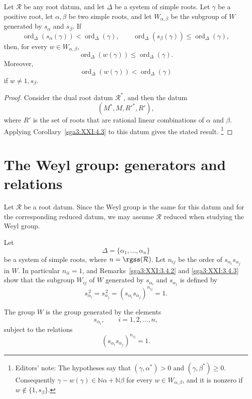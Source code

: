 \begin{corollary}\label{sga3:XXI:4.4}
Let \(\mathcal{R}\) be any root datum, and let \(\Delta\) be a system
of simple roots. Let \(\gamma\) be a positive root, let
\(\alpha,\beta\) be two simple roots, and let \(W_{\alpha,\beta}\) be
the subgroup of \(W\) generated by \(s_\alpha\) and \(s_\beta\). If
\[
 \operatorname{ord}_\Delta(s_\alpha(\gamma))
 <\operatorname{ord}_\Delta(\gamma),
 \qquad
 \operatorname{ord}_\Delta(s_\beta(\gamma))
 \le\operatorname{ord}_\Delta(\gamma),
\]
then, for every \(w\in W_{\alpha,\beta}\),
\[
 \operatorname{ord}_\Delta(w(\gamma))
 \le\operatorname{ord}_\Delta(\gamma).
\]
Moreover,
\[
 \operatorname{ord}_\Delta(w(\gamma))
 <\operatorname{ord}_\Delta(\gamma)
\]
if \(w\ne1,s_\beta\).
\end{corollary}

\begin{proof}
Consider the dual root datum \(\mathcal{R}^\ast\), and then the datum
\[
 (M^\ast,M,R'^\ast,R'),
\]
where \(R'\) is the set of roots that are rational linear
combinations of \(\alpha\) and \(\beta\). Applying
Corollary~\ref{sga3:XXI:4.3} to this datum gives the stated result.
\footnote{Editors' note: The hypotheses say that
\((\gamma,\alpha^\ast)>0\) and \((\gamma,\beta^\ast)\ge0\).
Consequently
\(\gamma-w(\gamma)\in\mathbb N\alpha+\mathbb N\beta\) for every
\(w\in W_{\alpha,\beta}\), and it is nonzero if
\(w\notin\{1,s_\beta\}\).}
\end{proof}

\section{The Weyl group: generators and relations}
\label{sga3:XXI:5}
\setcounter{theorem}{0}

Let \(\mathcal{R}\) be a root datum. Since the Weyl group is the same
for this datum and for the corresponding reduced datum, we may assume
\(\mathcal{R}\) reduced when studying the Weyl group.

Let
\[
 \Delta=\{\alpha_1,\ldots,\alpha_n\}
\]
be a system of simple roots, where \(n=\rgss(\mathcal{R})\). Let
\(n_{ij}\) be the order of \(s_{\alpha_i}s_{\alpha_j}\) in \(W\).
In particular \(n_{ii}=1\), and Remarks~\ref{sga3:XXI:3.4.2} and
\ref{sga3:XXI:3.4.3} show that the subgroup \(W_{ij}\) of \(W\)
generated by \(s_{\alpha_i}\) and \(s_{\alpha_j}\) is defined by
\[
 s_{\alpha_i}^{\,2}=s_{\alpha_j}^{\,2}
 =(s_{\alpha_i}s_{\alpha_j})^{n_{ij}}=1.
\]

\begin{theorem}\label{sga3:XXI:5.1}
The group \(W\) is the group generated by the elements
\[
 s_{\alpha_i},\qquad i=1,2,\ldots,n,
\]
subject to the relations
\[
 (s_{\alpha_i}s_{\alpha_j})^{n_{ij}}=1.
\]
\end{theorem}


